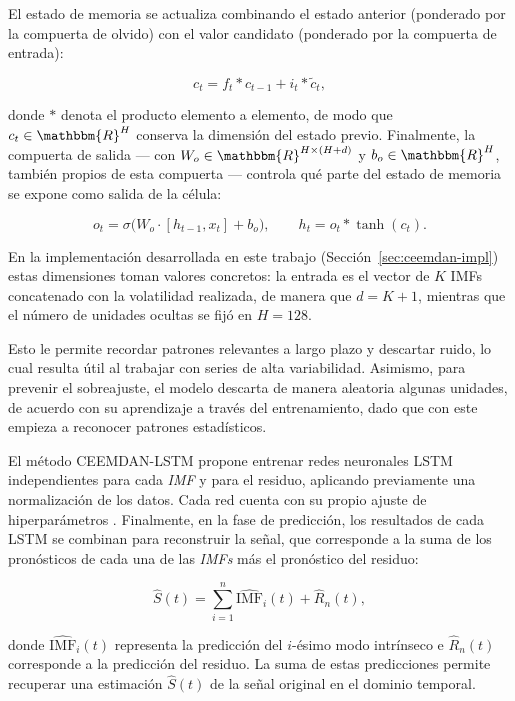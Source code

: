 \documentclass[12pt]{paper}
\begin{document}
El estado de memoria se actualiza combinando el estado anterior (ponderado por la compuerta de olvido) con el valor candidato (ponderado por la compuerta de entrada):

\begin{equation}
    c_t = f_t * c_{t-1} + i_t * \tilde{c}_t,
\end{equation}

donde $*$ denota el producto elemento a elemento, de modo que $c_t \in \mathbbm{R}^{H}$ conserva la dimensión del estado previo. Finalmente, la compuerta de salida --- con $W_o \in \mathbbm{R}^{H \times (H+d)}$ y $b_o \in \mathbbm{R}^{H}$, también propios de esta compuerta --- controla qué parte del estado de memoria se expone como salida de la célula:

\begin{equation}
    o_t = \sigma\bigl(W_o \cdot [h_{t-1}, x_t] + b_o\bigr),
    \qquad
    h_t = o_t * \tanh(c_t).
\end{equation}

En la implementación desarrollada en este trabajo (Sección~\ref{sec:ceemdan-impl}) estas dimensiones toman valores concretos: la entrada es el vector de $K$ IMFs concatenado con la volatilidad realizada, de manera que $d = K+1$, mientras que el número de unidades ocultas se fijó en $H = 128$.

Esto le permite recordar patrones relevantes a largo plazo y descartar ruido, lo cual resulta útil al trabajar con series de alta variabilidad. Asimismo, para prevenir el sobreajuste, el modelo descarta de manera aleatoria algunas unidades, de acuerdo con su aprendizaje a través del entrenamiento, dado que con este empieza a reconocer patrones estadísticos.

El método CEEMDAN-LSTM propone entrenar redes neuronales LSTM independientes para cada \textit{IMF} y para el residuo, aplicando previamente una normalización de los datos. Cada red cuenta con su propio ajuste de hiperparámetros \cite{cao2019financial}. Finalmente, en la fase de predicción, los resultados de cada LSTM se combinan para reconstruir la señal, que corresponde a la suma de los pronósticos de cada una de las \textit{IMFs} más el pronóstico del residuo:

\begin{equation}
 \hat{S}(t) = \sum_{i=1}^{n} \widehat{\mathrm{IMF}}_i(t) + \widehat{R}_n(t),
\end{equation}

donde $\widehat{\mathrm{IMF}}_i(t)$ representa la predicción del $i$-ésimo modo intrínseco e $\widehat{R}_n(t)$ corresponde a la predicción del residuo. La suma de estas predicciones permite recuperar una estimación $\hat{S}(t)$ de la señal original en el dominio temporal.
\end{document}
